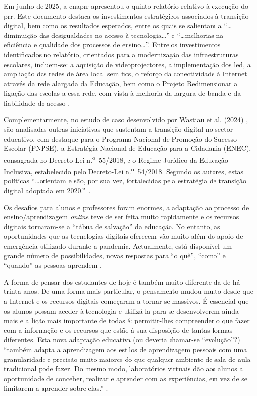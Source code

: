 Em junho de 2025, a \acrshort{cnaprr} apresentou o quinto relatório relativo à execução do \acrshort{prr}. Este documento destaca os investimentos estratégicos associados à transição digital, bem como os resultados esperados, entre os quais se salientam a ``\ldots diminuição das desigualdades no acesso à tecnologia\ldots '' e ``\ldots melhorias na eficiência e qualidade dos processos de ensino\ldots''. Entre os investimentos identificados no relatório, orientados para a modernização das infraestruturas escolares, incluem-se: a aquisição de videoprojectores, a implementação dos \acrfull{led}, a ampliação das redes de área local sem fios, o reforço da conectividade à Internet através da rede alargada da Educação, bem como o Projeto Redimensionar a ligação das escolas a essa rede, com vista à melhoria da largura de banda e da fiabilidade do acesso \cite{cnaprr2025}.

Complementarmente, no estudo de caso desenvolvido por Wastiau et al. (2024) \cite{estrategiatransdigital}, são analisadas outras iniciativas que sustentam a transição digital no sector educativo, com destaque para o Programa Nacional de Promoção do Sucesso Escolar (PNPSE), a Estratégia Nacional de Educação para a Cidadania (ENEC), consagrada no Decreto-Lei n.\textsuperscript{o}~55/2018, e o Regime Jurídico da Educação Inclusiva, estabelecido pelo Decreto-Lei n.\textsuperscript{o}~54/2018. Segundo os autores, estas políticas ``\ldots orientam e são, por sua vez, fortalecidas pela estratégia de transição digital adoptada em 2020.''~\cite{estrategiatransdigital}.

Os desafios para alunos e professores foram enormes, a adaptação ao processo de ensino/aprendizagem \textit{online} teve de ser feita muito rapidamente e os recursos digitais tornaram-se a ``tábua de salvação'' da educação. No entanto, as oportunidades que as tecnologias digitais oferecem vão muito além do apoio de emergência utilizado durante a pandemia. Actualmente, está disponível um grande número de possibilidades, novas respostas para ``o quê'', ``como'' e ``quando'' as pessoas aprendem \cite{oecd_state_2021}.

A forma de pensar dos estudantes de hoje é também muito diferente da de há trinta anos. De uma forma mais particular, o pensamento mudou muito desde que a Internet e os recursos digitais começaram a tornar-se massivos. É essencial que os alunos possam aceder à tecnologia e utilizá-la para se desenvolverem ainda mais e a lição mais importante de todas é: permitir-lhes compreender o que fazer com a informação e os recursos que estão à sua disposição de tantas formas diferentes. Esta nova adaptação educativa (ou deveria chamar-se ``evolução''?) ``também adapta a aprendizagem aos estilos de aprendizagem pessoais com uma granularidade e precisão muito maiores do que qualquer ambiente de sala de aula tradicional pode fazer. Do mesmo modo, laboratórios virtuais dão aos alunos a oportunidade de conceber, realizar e aprender com as experiências, em vez de se limitarem a aprender sobre elas.'' \cite{oecd_state_2021}.

